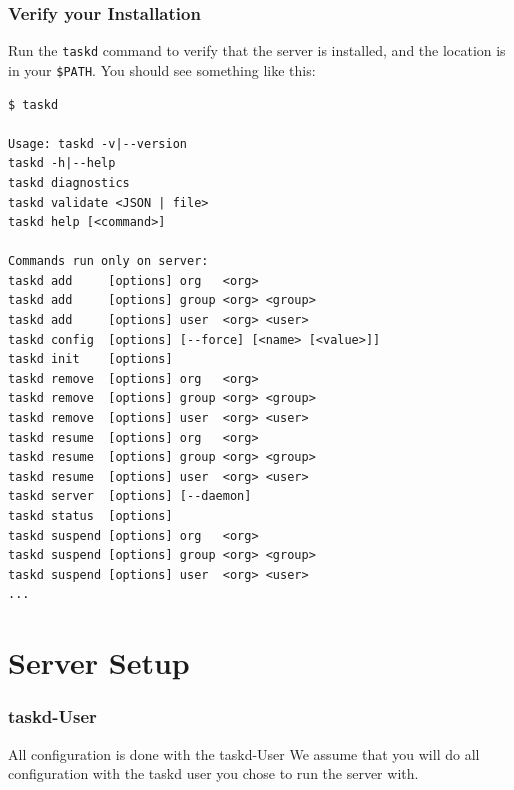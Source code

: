 \documentclass[t,handout]{beamer}
\begin{document}
\begin{frame}[fragile]\frametitle{Verify your Installation}
    \vfill
    Run the \verb+taskd+ command to verify that the server is installed, and the location is in your \verb+$PATH+. You should see something like this:

    \begin{lstlisting}
$ taskd

Usage: taskd -v|--version
taskd -h|--help
taskd diagnostics
taskd validate <JSON | file>
taskd help [<command>]

Commands run only on server:
taskd add     [options] org   <org>
taskd add     [options] group <org> <group>
taskd add     [options] user  <org> <user>
taskd config  [options] [--force] [<name> [<value>]]
taskd init    [options]
taskd remove  [options] org   <org>
taskd remove  [options] group <org> <group>
taskd remove  [options] user  <org> <user>
taskd resume  [options] org   <org>
taskd resume  [options] group <org> <group>
taskd resume  [options] user  <org> <user>
taskd server  [options] [--daemon]
taskd status  [options]
taskd suspend [options] org   <org>
taskd suspend [options] group <org> <group>
taskd suspend [options] user  <org> <user>
...\end{lstlisting}
\end{frame}

\section{Server Setup}

\begin{frame}[fragile]\frametitle{taskd-User}
    \vfill
    \begin{alertblock}{All configuration is done with the taskd-User}
        We assume that you will do all configuration with the taskd user you chose to run the server with.
	\end{alertblock}
\end{frame}
\end{document}
